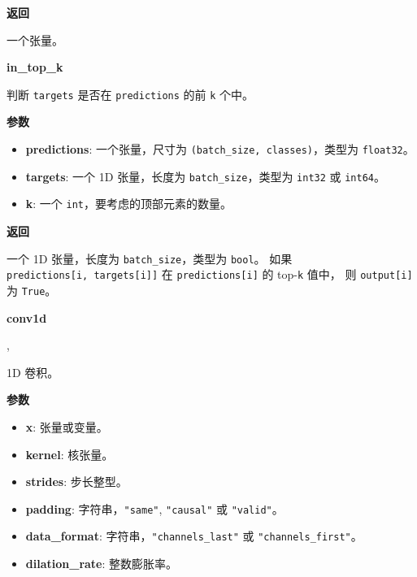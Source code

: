 \textbf{返回}

一个张量。


\textbf{in\_top\_k}\label{inux5ftopux5fk}

\begin{Shaded}
\begin{Highlighting}[]
\end{Highlighting}
\end{Shaded}

判断 \texttt{targets} 是否在 \texttt{predictions} 的前 \texttt{k} 个中。

\textbf{参数}

\begin{itemize}
\tightlist
\item
  \textbf{predictions}: 一个张量，尺寸为
  \texttt{(batch\_size,\ classes)}，类型为 \texttt{float32}。
\item
  \textbf{targets}: 一个 1D 张量，长度为 \texttt{batch\_size}，类型为
  \texttt{int32} 或 \texttt{int64}。
\item
  \textbf{k}: 一个 \texttt{int}，要考虑的顶部元素的数量。
\end{itemize}

\textbf{返回}

一个 1D 张量，长度为 \texttt{batch\_size}，类型为 \texttt{bool}。 如果
\texttt{predictions{[}i,\ targets{[}i{]}{]}} 在
\texttt{predictions{[}i{]}} 的 top-\texttt{k} 值中， 则
\texttt{output{[}i{]}} 为 \texttt{True}。


\textbf{conv1d}\label{conv1d}

\begin{Shaded}
\begin{Highlighting}[]
\OperatorTok{=}\OperatorTok{=}, \\
\hspace{3cm}\OperatorTok{=}\OperatorTok{=}\NormalTok{)}
\end{Highlighting}
\end{Shaded}

1D 卷积。

\textbf{参数}

\begin{itemize}
\tightlist
\item
  \textbf{x}: 张量或变量。
\item
  \textbf{kernel}: 核张量。
\item
  \textbf{strides}: 步长整型。
\item
  \textbf{padding}: 字符串，\texttt{"same"}, \texttt{"causal"} 或
  \texttt{"valid"}。
\item
  \textbf{data\_format}: 字符串，\texttt{"channels\_last"} 或
  \texttt{"channels\_first"}。
\item
  \textbf{dilation\_rate}: 整数膨胀率。
\end{itemize}

